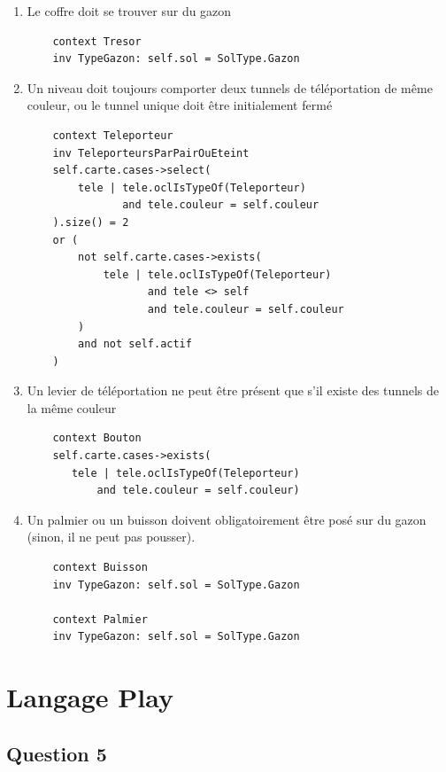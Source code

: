 \documentclass[11pt]{article}
\begin{document}
\begin{enumerate}
  \item Le coffre doit se trouver sur du gazon
  
  \begin{verbatim}
    context Tresor
    inv TypeGazon: self.sol = SolType.Gazon
  \end{verbatim}     
  
  \item  Un niveau doit toujours comporter deux tunnels de téléportation de même couleur, ou le tunnel unique doit être initialement fermé 
  
  \begin{verbatim}
    context Teleporteur
    inv TeleporteursParPairOuEteint
    self.carte.cases->select(
        tele | tele.oclIsTypeOf(Teleporteur)
               and tele.couleur = self.couleur
    ).size() = 2
    or (
        not self.carte.cases->exists(
            tele | tele.oclIsTypeOf(Teleporteur)
                   and tele <> self
                   and tele.couleur = self.couleur
        )
        and not self.actif
    )
  \end{verbatim}     
  
  \item Un levier de téléportation ne peut être présent que s'il existe des tunnels de la même couleur
  
  \begin{verbatim}
    context Bouton
    self.carte.cases->exists(
       tele | tele.oclIsTypeOf(Teleporteur)
           and tele.couleur = self.couleur)
  \end{verbatim}     
  
  \item Un palmier ou un buisson doivent obligatoirement être posé sur du gazon (sinon, il ne peut pas pousser).
  
  \begin{verbatim}
    context Buisson
    inv TypeGazon: self.sol = SolType.Gazon
    
    context Palmier
    inv TypeGazon: self.sol = SolType.Gazon
  \end{verbatim}     
  
\end{enumerate}

\section{Langage Play}

\subsection{Question 5}
\end{document}
